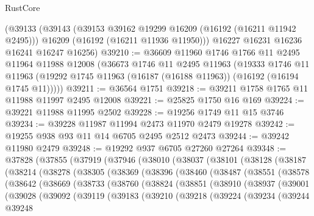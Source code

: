 \begin{lexlean}{RustCore}
\begin{coremodule}
    (@39133
      (@39143
        (@39153 @39162 @19299 @16209 (@16192 (@16211 @11942 @2495)))
        @16209
        (@16192 (@16211 @11936 @11950)))
      @16227
      @16231
      @16236
      @16241
      @16247
      @16256)
@39210 := @36609
    @11960
    @1746
    @1766
    @11
    @2495
    @11964
    @11988
    @12008
    (@36673
      @1746
      @11
      @2495
      @11963
      (@19333
        @1746
        @11
        @11963
        (@19292 @1745 @11963 (@16187 (@16188 @11963)) (@16192 (@16194 @1745 @11)))))
@39211 := @36564 @1751
@39218 := @39211 @1758 @1765 @11 @11988 @11997 @2495 @12008
@39221 := @25825 @1750 @16 @169
@39224 := @39221 @11988 @11995 @2502
@39228 := @19256 @1749 @11 @15 @3746
@39234 := @39228 @11987 @11994 @2473 @11970 @2479 @19278
@39242 := @19255 @938 @93 @11 @14 @6705 @2495 @2512 @2473
@39244 := @39242 @11980 @2479
@39248 := @19292 @937 @6705 @27260 @27264
@39348 := @37828
    (@37855
      (@37919
        (@37946
          (@38010
            (@38037
              (@38101
                (@38128
                  (@38187
                    (@38214
                      (@38278
                        (@38305
                          (@38369
                            (@38396
                              (@38460
                                (@38487
                                  (@38551
                                    (@38578
                                      (@38642
                                        (@38669
                                          (@38733
                                            (@38760
                                              (@38824
                                                (@38851
                                                  (@38910
                                                    (@38937
                                                      (@39001
                                                        (@39028
                                                          (@39092
                                                            (@39119
                                                              (@39183
                                                                (@39210
                                                                  (@39218
                                                                    (@39224
                                                                      (@39234
                                                                        (@39244
                                                                          @39248

\end{coremodule}
\end{lexlean}
